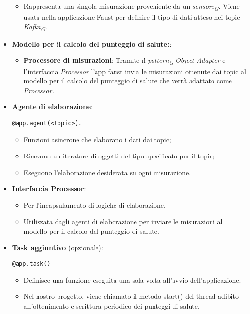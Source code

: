 \begin{itemize}
\begin{itemize}
        \item Rappresenta una singola misurazione proveniente da un \textit{sensore}\textsubscript{\textit{G}}. Viene usata nella applicazione Faust per definire il tipo di dati atteso nei topic \textit{Kafka}\textsubscript{\textit{G}}.
    \end{itemize}
    \item \textbf{Modello per il calcolo del punteggio di salute:}:
    \begin{itemize}
        \item \textbf{Processore di misurazioni}: 
        Tramite il \textit{pattern}\textsubscript{\textit{G}} \textit{Object Adapter} e l'interfaccia \textit{Processor} l'app faust invia le misurazioni ottenute dai topic al modello per il calcolo del punteggio di salute che verrà adattato come \textit{Processor.}
    \end{itemize}
    \item \textbf{Agente di elaborazione}: 
    \begin{lstlisting}[style=code]
        @app.agent(<topic>).
    \end{lstlisting}  
    \begin{itemize}
        \item Funzioni asincrone che elaborano i dati dai topic;
        \item Ricevono un iteratore di oggetti del tipo specificato per il topic;
        \item Eseguono l'elaborazione desiderata su ogni misurazione.
    \end{itemize}
    \item \textbf{Interfaccia Processor}:
    \begin{itemize}
        \item Per l'incapsulamento di logiche di elaborazione.
        \item Utilizzata dagli agenti di elaborazione per inviare le misurazioni al modello per il calcolo del punteggio di salute.
    \end{itemize}
    \item \textbf{Task aggiuntivo} (opzionale): 
    \begin{lstlisting}[style=code]
    @app.task()
        \end{lstlisting}  
    \begin{itemize}
        \item Definisce una funzione eseguita una sola volta all'avvio dell'applicazione.
        \item Nel nostro progetto, viene chiamato il metodo start() del thread adibito all'ottenimento e scrittura periodico dei punteggi di salute.
    \end{itemize}
\end{itemize}

